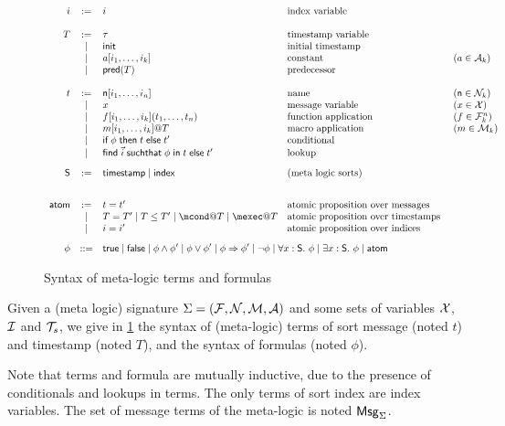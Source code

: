 \begin{figure}[t]
  \begin{gather*}
    \begin{array}{rclll}
      i &:=& i & \text{index variable} & \\
      \\
      T &:=& \tau & \text{timestamp variable} & \\
      &\mid& \tinit & \text{initial timestamp} & \\
      &\mid& a[i_1,\ldots,i_k] & \text{constant} & (a\in\Act_k) \\
      &\mid & \pre(T) & \text{predecessor} & \\
      \\
      t & := & \mathsf{n}[i_1,\ldots,i_n] &\text{name} & (\mathsf{n}\in\N_k) \\
      & \mid & x  & \text{message variable} & (x\in\X) \\
      & \mid & f[i_1,\ldots,i_k](t_1,\dots,t_n) &\text{function application} &
      (f\in\F_k^n)\\
      & \mid & m[i_1,\ldots,i_k]@T &\text{macro application} & (m\in\Mac_k)\\
      & \mid & \myif \phi \mythen t \myelse t'
      &\text{conditional} \\
      & \mid & \myfind \vec{i} \mysuchthat \phi \myin t \myelse t'
      &\text{lookup}
      \\[2ex]
      \Sort &  := & \timestamp \mid \idx & \text{(meta logic sorts)} \\
      \\[2ex]
      \atom & := & t=t'
      & \text{atomic proposition over messages } \\
      &\mid & T=T' \mid T \leq T' \mid \mcond@T \mid \mexec@T &  \text{atomic proposition
        over timestamps } \\
      &\mid & i=i'  &  \text{atomic proposition
        over indices }
      \\[2ex]
      \phi & ::= &  \lefteqn{\true \mid \false \mid \phi \wedge \phi' \mid  \phi
      \vee \phi' \mid   \phi \Rightarrow \phi'\mid \neg \phi \mid
      \forall x : \Sort.\ \phi \mid \exists x:\Sort.\ \phi \mid \atom }
    \end{array}
  \end{gather*}
  \caption{Syntax of meta-logic terms and formulas}
  \label{fig:terms-form}
\end{figure}

\begin{definition}
  Given a (meta logic) signature $\Sigma = (\mathcal{F},\mathcal{N},\mathcal{M},\mathcal{A})$
  and some sets of variables
  $\mathcal{X}$, $\mathcal{I}$ and ${\mathcal{T}_s}$,
  we give in \cref{fig:terms-form} the syntax of (meta-logic) terms
  of sort message (noted $t$) and timestamp (noted $T$),
  and the syntax of formulas (noted $\phi$).  
  
  Note that terms and formula are mutually inductive, due to the presence
  of conditionals and lookups in terms.
  The only terms of sort index are index variables.
  The set of message terms of the meta-logic is noted $\mathsf{Msg}_\Sigma$.
\end{definition}

